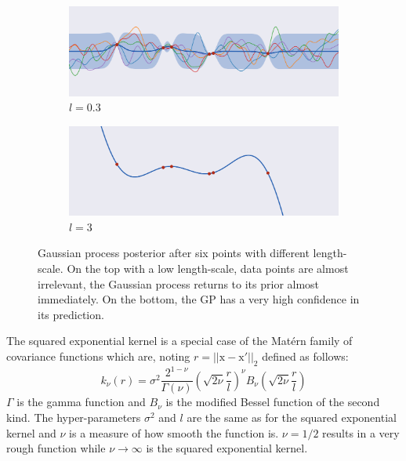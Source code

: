 \begin{figure}[htb]
    \centering
    \begin{subfigure}[b]{\textwidth}
        \includegraphics[width=\textwidth]{img_hyperopt/gp_lengthscale_small}
        \caption{$l = 0.3$}
    \end{subfigure}

    \begin{subfigure}[b]{\textwidth}
        \includegraphics[width=\textwidth]{img_hyperopt/gp_lengthscale_big}
        \caption{$l = 3$}
    \end{subfigure}
    \caption{Gaussian process posterior after six points with different length-scale. On the top with a low length-scale, data points are almost irrelevant, the Gaussian process returns to its prior almost immediately. On the bottom, the GP has a very high confidence in its prediction.}
    \label{fig:gp_lengthscale}
\end{figure}

The squared exponential kernel is a special case of the Matérn family of covariance functions which are, noting $r = || \mathrm{x} - \mathrm{x'} ||_2$ defined as follows:
\begin{equation}
    k_{\nu}(r) = \sigma^2 \frac{2^{1-\nu}}{\Gamma(\nu)} \left( \sqrt{2\nu} \frac{r}{l}\right)^{\nu} B_{\nu} \left( \sqrt{2\nu} \frac{r}{l}\right)
\end{equation}
$\Gamma$ is the gamma function and $B_{\nu}$ is the modified Bessel function of the second kind. The hyper-parameters $\sigma^2$ and $l$ are the same as for the squared exponential kernel and $\nu$ is a measure of how smooth the function is. $\nu = 1/2$ results in a very rough function while $\nu \to \infty$ is the squared exponential kernel.

